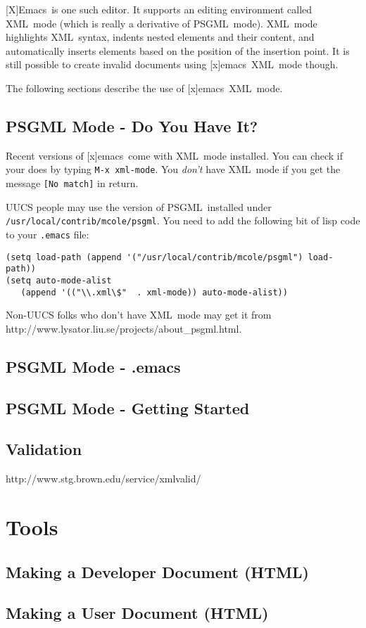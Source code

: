 \documentclass{article}
\newcommand{\acronym}[1]{#1}
\newcommand{\filename}[1]{\texttt{#1}}
\newcommand{\xml}{\acronym{XML}}
\newcommand{\Xml}{\xml}
\newcommand{\psgml}{\acronym{PSGML}}
\newcommand{\emacs}{[x]emacs}
\newcommand{\Emacs}{[X]Emacs}
\newcommand{\keyboard}[1]{\texttt{#1}}
\newcommand{\screen}[1]{\texttt{#1}}
\newcommand{\psgmlurl}{http://www.lysator.liu.se/projects/about\_psgml.html}
\newcommand{\SUBSECgettingSources}{PSGML Mode - Do You Have It?}
\newcommand{\SUBSECdotEmacs}{PSGML Mode - .emacs}
\newcommand{\SUBSECgettingStarted}{PSGML Mode - Getting Started}
\newcommand{\SUBSECvalidation}{Validation}
\newcommand{\SECtools}{Tools}
\newcommand{\SUBSECmakeDevHtmlDoc}{Making a Developer Document (HTML)}
\newcommand{\SUBSECmakeUserHtmlDoc}{Making a User Document (HTML)}
\begin{document}
\Emacs\ is one such editor.  It supports an editing environment called
\xml\ mode (which is really a derivative of \psgml\ mode).  \Xml\ mode
highlights \xml\ syntax, indents nested elements and their content, and
automatically inserts elements based on the position of the insertion point.
It is still possible to create invalid documents using \emacs\ 
\xml\ mode though.

The following sections describe the use of \emacs\ \xml\ mode.

\subsection{\SUBSECgettingSources}
\label{\SUBSECgettingSources}

Recent versions of \emacs\ come with \xml\ mode installed.  You can check
if your does by typing \keyboard{M-x xml-mode}.  You \emph{don't} have
\xml\ mode if you get the message
\screen{[No match]} in return.

UUCS people may use the version of \psgml\ installed under
\keyboard{/usr/local/contrib/mcole/psgml}.  You need to add the
following bit of lisp code to your \filename{.emacs} file:

\begin{verbatim}
(setq load-path (append '("/usr/local/contrib/mcole/psgml") load-path))
(setq auto-mode-alist  
   (append '(("\\.xml\$"  . xml-mode)) auto-mode-alist))   
\end{verbatim}

Non-UUCS folks who don't have \xml\ mode may get it from \psgmlurl.

\subsection{\SUBSECdotEmacs}
\label{\SUBSECdotEmacs}



\subsection{\SUBSECgettingStarted}
\label{\SUBSECgettingStarted}

\subsection{\SUBSECvalidation}
\label{\SUBSECvalidation}

http://www.stg.brown.edu/service/xmlvalid/

\section{\SECtools}
\label{\SECtools}


\subsection{\SUBSECmakeDevHtmlDoc}
\label{\SUBSECmakeDevHtmlDoc}


\subsection{\SUBSECmakeUserHtmlDoc}
\label{\SUBSECmakeUserHtmlDoc}
\end{document}
